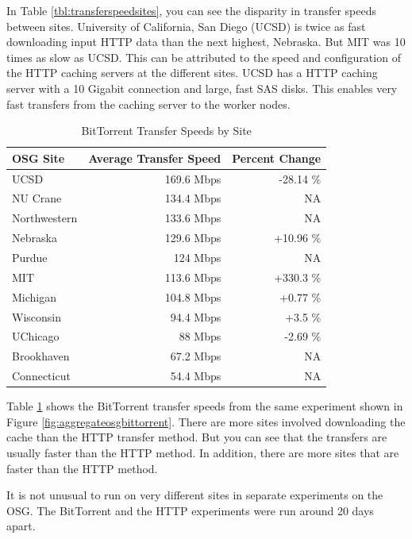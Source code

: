 In Table \ref{tbl:transferspeedsites}, you can see the disparity in transfer speeds between sites.  University of California, San Diego (UCSD) is twice as fast downloading input HTTP data than the next highest, Nebraska.  But MIT was 10 times as slow as UCSD.  This can be attributed to the speed and configuration of the HTTP caching servers at the different sites.  UCSD has a HTTP caching server with a 10 Gigabit connection and large, fast SAS disks.  This enables very fast transfers from the caching server to the worker nodes.


\begin{table}[h!t]
\centering
\bgroup
\def\arraystretch{1.5}
\begin{tabular}{l|r|r}
	\textbf{OSG Site} & \textbf{Average Transfer Speed} & \textbf{Percent Change} \\ \hline
	UCSD & 169.6 Mbps & -28.14 \% \\ \hline
	NU Crane & 134.4 Mbps & NA \\ \hline
	Northwestern & 133.6 Mbps & NA \\ \hline
	Nebraska & 129.6 Mbps & +10.96 \% \\ \hline
	Purdue & 124 Mbps & NA \\ \hline
	MIT & 113.6 Mbps & +330.3 \% \\ \hline
	Michigan & 104.8 Mbps & +0.77 \% \\ \hline
	Wisconsin & 94.4 Mbps & +3.5 \% \\ \hline
	UChicago & 88 Mbps & -2.69 \% \\ \hline
	Brookhaven & 67.2 Mbps & NA \\ \hline
	Connecticut & 54.4 Mbps & NA \\ \hline
	
\end{tabular}
\egroup
\caption{BitTorrent Transfer Speeds by Site}
\label{tbl:bittorrenttransferspeedsites}
\end{table}

Table \ref{tbl:bittorrenttransferspeedsites} shows the BitTorrent transfer speeds from the same experiment shown in Figure \ref{fig:aggregateosgbittorrent}.  There are more sites involved downloading the cache than the HTTP transfer method.  But you can see that the transfers are usually faster than the HTTP method.  In addition, there are more sites that are faster than the  HTTP method.

It is not unusual to run on very different sites in separate experiments on the OSG.  The BitTorrent and the HTTP experiments were run around 20 days apart.

